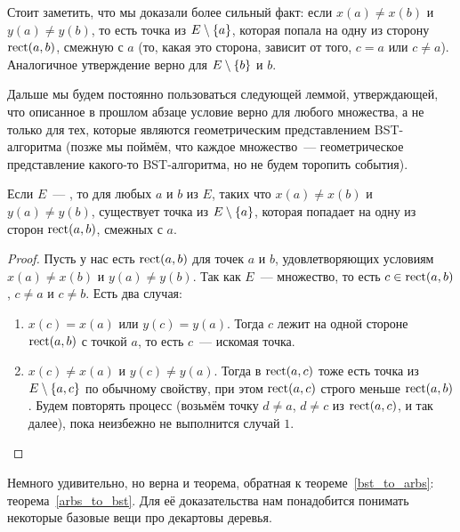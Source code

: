 Стоит заметить, что мы доказали более сильный факт: если $x(a) \neq x(b)$ и $y(a) \neq y(b)$, то есть точка из $E \setminus \lbrace a\rbrace$, которая попала на одну из сторону $\operatorname{rect}(a, b)$, смежную с $a$ (то, какая это сторона, зависит от того, $c = a$ или $c \neq a$). Аналогичное утверждение верно для $E \setminus \lbrace b\rbrace$ и $b$.

Дальше мы будем постоянно пользоваться следующей леммой, утверждающей, что описанное в прошлом абзаце условие верно для любого \arbs множества, а не только для тех, которые
являются геометрическим представлением BST-алгоритма (позже мы поймём, что каждое
\arbs множество~--- геометрическое представление какого-то BST-алгоритма, но не будем торопить события).

\begin{lemma}\label{strong_arbs} Если $E$~--- \arbs, то для любых $a$ и $b$ из $E$, таких что $x(a) \neq x(b)$ и $y(a) \neq y(b)$, существует точка из $E \setminus \lbrace a\rbrace$, которая попадает на одну из сторон $\operatorname{rect}(a, b)$, смежных с $a$.
\end{lemma}
\begin{proof} Пусть у нас есть $\operatorname{rect}(a, b)$ для точек $a$ и $b$, удовлетворяющих
	условиям $x(a) \neq x(b)$ и $y(a) \neq y(b)$. Так как $E$~--- \arbs множество, то есть
	$c \in \operatorname{rect}(a, b)$, $c \neq a$ и $c \neq b$. Есть два случая:
	\begin{enumerate}
		\item $x(c) = x(a)$ или $y(c) = y(a)$. Тогда $c$ лежит на одной стороне $\operatorname{rect}(a, b)$
		      с точкой $a$, то есть $c$~--- искомая точка.
		\item $x(c) \neq x(a)$ и $y(c) \neq y(a)$. Тогда в $\operatorname{rect}(a, c)$ тоже есть точка из $E \setminus \lbrace a, c\rbrace$ по обычному \arbs свойству, при этом $\operatorname{rect}(a, c)$ строго меньше
		      $\operatorname{rect}(a, b)$. Будем повторять процесс (возьмём точку $d \neq a$, $d \neq c$ из $\operatorname{rect}(a, c)$,
		      и так далее), пока неизбежно не выполнится случай $1$.
	\end{enumerate}
\end{proof}

Немного удивительно, но верна и теорема, обратная к теореме~\ref{bst_to_arbs}:
теорема~\ref{arbs_to_bst}. Для её доказательства нам понадобится понимать
некоторые базовые вещи про декартовы деревья.


